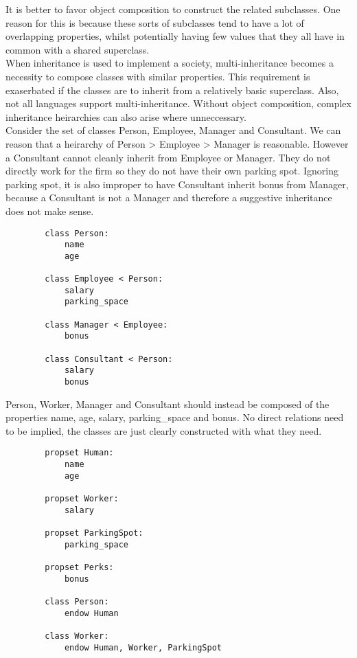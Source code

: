 \documentclass{article}
\begin{document}
\begin{enumerate}
    It is better to favor object composition to construct the related subclasses. One reason for this is because these sorts of subclasses tend to have a lot of overlapping properties, whilst potentially having few values that they all have in common with a shared superclass. \\[.1in]
    When inheritance is used to implement a society, multi-inheritance becomes a necessity to compose classes with similar properties. This requirement is exaserbated if the classes are to inherit from a relatively basic superclass. Also, not all languages support multi-inheritance. Without object composition, complex inheritance heirarchies can also arise where unneccessary. \\[.1in]
    Consider the set of classes Person, Employee, Manager and Consultant. We can reason that a heirarchy of Person > Employee > Manager is reasonable. However a Consultant cannot cleanly inherit from Employee or Manager. They do not directly work for the firm so they do not have their own parking spot. Ignoring parking spot, it is also improper to have Consultant inherit bonus from Manager, because a Consultant is not a Manager and therefore a suggestive inheritance does not make sense. \\[.1in]
    \begin{verbatim}
        class Person:
            name
            age

        class Employee < Person:
            salary
            parking_space

        class Manager < Employee:
            bonus

        class Consultant < Person:
            salary
            bonus
    \end{verbatim}
    \pagebreak
    Person, Worker, Manager and Consultant should instead be composed of the properties name, age, salary, parking\_space and bonus. No direct relations need to be implied, the classes are just clearly constructed with what they need.
    \begin{verbatim}
        propset Human:
            name
            age

        propset Worker:
            salary

        propset ParkingSpot:
            parking_space

        propset Perks:
            bonus

        class Person:
            endow Human

        class Worker:
            endow Human, Worker, ParkingSpot


\end{verbatim}
\end{enumerate}
\end{document}
